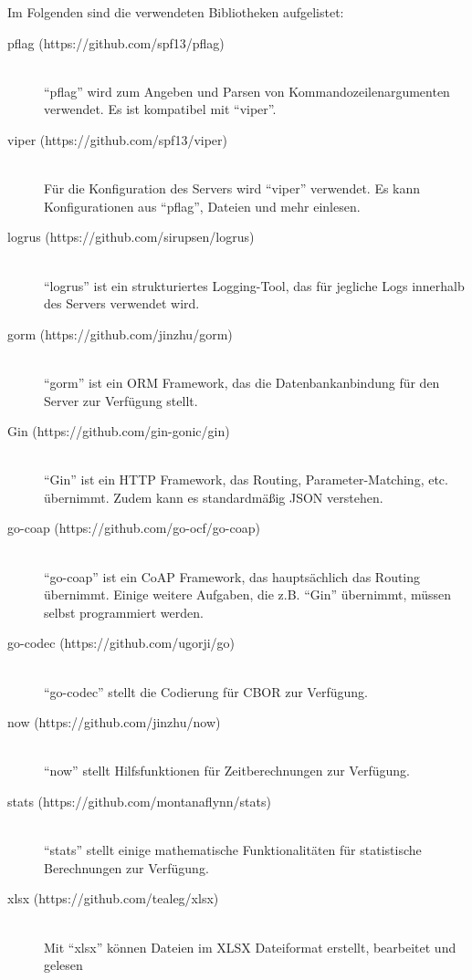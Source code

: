 Im Folgenden sind die verwendeten Bibliotheken aufgelistet:
\begin{description}
	\item[pflag (https://github.com/spf13/pflag)] \hfill \\
		\enquote{pflag} wird zum Angeben und Parsen von Kommandozeilenargumenten verwendet. Es ist kompatibel mit \enquote{viper}.
	\item[viper (https://github.com/spf13/viper)] \hfill \\
		Für die Konfiguration des Servers wird \enquote{viper} verwendet. Es kann Konfigurationen aus \enquote{pflag}, Dateien und mehr einlesen.
	\item[logrus (https://github.com/sirupsen/logrus)] \hfill \\
		\enquote{logrus} ist ein strukturiertes Logging-Tool, das für jegliche Logs innerhalb des Servers verwendet wird.
	\item[gorm (https://github.com/jinzhu/gorm)] \hfill \\
		\enquote{gorm} ist ein \gls{ORM} Framework, das die Datenbankanbindung für den Server zur Verfügung stellt.
	\item[Gin (https://github.com/gin-gonic/gin)] \hfill \\
		\enquote{Gin} ist ein HTTP Framework, das Routing, Parameter-Matching, etc. übernimmt. Zudem kann es standardmäßig \gls{JSON} verstehen.
	\item[go-coap (https://github.com/go-ocf/go-coap)] \hfill \\
		\enquote{go-coap} ist ein \gls{CoAP} Framework, das hauptsächlich das Routing übernimmt. Einige weitere Aufgaben, die z.B. \enquote{Gin} übernimmt, müssen selbst programmiert werden.
	\item[go-codec (https://github.com/ugorji/go)] \hfill \\
		\enquote{go-codec} stellt die Codierung für \gls{CBOR} zur Verfügung.
	\item[now (https://github.com/jinzhu/now)] \hfill \\
		\enquote{now} stellt Hilfsfunktionen für Zeitberechnungen zur Verfügung.
	\item[stats (https://github.com/montanaflynn/stats)] \hfill \\
		\enquote{stats} stellt einige mathematische Funktionalitäten für statistische Berechnungen zur Verfügung.
	\item[xlsx (https://github.com/tealeg/xlsx)] \hfill \\
		Mit \enquote{xlsx} können Dateien im \gls{XLSX} Dateiformat erstellt, bearbeitet und gelesen

\end{description}
